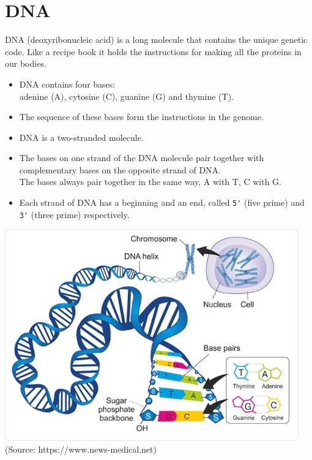 

\section{DNA}
DNA (deoxyribonucleic acid) is a long molecule that contains the
unique genetic code. Like a recipe book it holds the instructions for
making all the proteins in our bodies.
\begin{itemize}
\item DNA contains four bases:\\
adenine (A), cytosine (C), guanine (G) and thymine (T).
\item The sequence of these bases form the instructions in the genome.
\item DNA is a two-stranded molecule.
\item The bases on one strand of the DNA molecule pair together with
complementary bases on the opposite strand of DNA.\\
The bases always pair together in the same way, A with T, C with G.
\item Each strand of DNA has a beginning and an end,
called \verb|5'| (five prime) and \verb|3'| (three prime) respectively.
\end{itemize}

\begin{centering}
\includegraphics[width=360pt]{images/coursework/dna.jpeg}\\
(Source: https://www.news-medical.net)
\end{centering}

